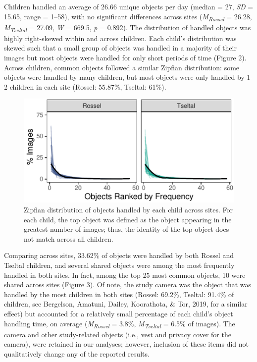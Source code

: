 \documentclass[10pt, letterpaper]{article}
\newenvironment{CodeChunk}{}{}
\begin{document}
Children handled an average of 26.66 unique objects per day (median =
27, \emph{SD} = 15.65, range = 1--58), with no significant differences
across sites (\emph{M}\textsubscript{\emph{Rossel}} = 26.28,
\emph{M}\textsubscript{\emph{Tseltal}} = 27.09, \emph{W} = 669.5,
\emph{p} = 0.892). The distribution of handled objects was highly
right-skewed within and across children. Each child's distribution was
skewed such that a small group of objects was handled in a majority of
their images but most objects were handled for only short periods of
time (Figure 2). Across children, common objects followed a similar
Zipfian distribution: some objects were handled by many children, but
most objects were only handled by 1-2 children in each site (Rossel:
55.87\%, Tseltal: 61\%).

\begin{CodeChunk}
\begin{figure}[h]

{\centering \includegraphics{figs/zipfian-objects-fig-1} 

}

\caption[Zipfian distribution of objects handled by each child across sites]{Zipfian distribution of objects handled by each child across sites. For each child, the top object was defined as the object appearing in the greatest number of images; thus, the identity of the top object does not match across all children.}\label{fig:zipfian-objects-fig}
\end{figure}
\end{CodeChunk}

Comparing across sites, 33.62\% of objects were handled by both Rossel
and Tseltal children, and several shared objects were among the most
frequently handled in both sites. In fact, among the top 25 most common
objects, 10 were shared across sites (Figure 3). Of note, the study
camera was the object that was handled by the most children in both
sites (Rossel: 69.2\%, Tseltal: 91.4\% of children, see Bergelson,
Amatuni, Dailey, Koorathota, \& Tor, 2019, for a similar effect) but
accounted for a relatively small percentage of each child's object
handling time, on average (\emph{M}\textsubscript{\emph{Rossel}} =
3.8\%, \emph{M}\textsubscript{\emph{Tseltal}} = 6.5\% of images). The
camera and other study-related objects (i.e., vest and privacy cover for
the camera), were retained in our analyses; however, inclusion of these
items did not qualitatively change any of the reported results.
\end{document}
